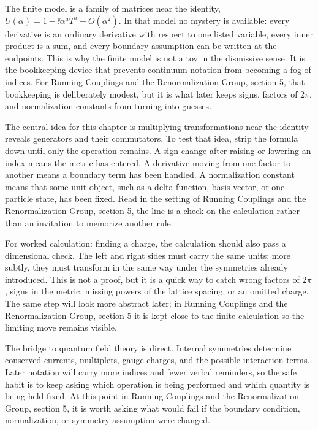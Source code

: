 The finite model is a family of matrices near the identity, \(U(\alpha)=1-\ii\alpha^aT^a+O(\alpha^2)\).  In that model no mystery is available: every derivative is an ordinary derivative with respect to one listed variable, every inner product is a sum, and every boundary assumption can be written at the endpoints.  This is why the finite model is not a toy in the dismissive sense.  It is the bookkeeping device that prevents continuum notation from becoming a fog of indices.  For Running Couplings and the Renormalization Group, section 5, that bookkeeping is deliberately modest, but it is what later keeps signs, factors of \(2\pi\), and normalization constants from turning into guesses.

The central idea for this chapter is multiplying transformations near the identity reveals generators and their commutators.  To test that idea, strip the formula down until only the operation remains.  A sign change after raising or lowering an index means the metric has entered.  A derivative moving from one factor to another means a boundary term has been handled.  A normalization constant means that some unit object, such as a delta function, basis vector, or one-particle state, has been fixed.  Read in the setting of Running Couplings and the Renormalization Group, section 5, the line is a check on the calculation rather than an invitation to memorize another rule.

For worked calculation: finding a charge, the calculation should also pass a dimensional check.  The left and right sides must carry the same units; more subtly, they must transform in the same way under the symmetries already introduced.  This is not a proof, but it is a quick way to catch wrong factors of \(2\pi\), signs in the metric, missing powers of the lattice spacing, or an omitted charge.  The same step will look more abstract later; in Running Couplings and the Renormalization Group, section 5 it is kept close to the finite calculation so the limiting move remains visible.

The bridge to quantum field theory is direct.  Internal symmetries determine conserved currents, multiplets, gauge charges, and the possible interaction terms.  Later notation will carry more indices and fewer verbal reminders, so the safe habit is to keep asking which operation is being performed and which quantity is being held fixed.  At this point in Running Couplings and the Renormalization Group, section 5, it is worth asking what would fail if the boundary condition, normalization, or symmetry assumption were changed.

